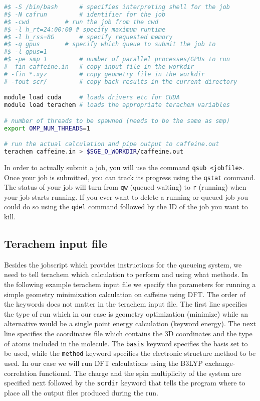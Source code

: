 \documentclass[a4paper,12pt]{assignment}
\begin{document}
\begin{lstlisting}[language=bash,caption={Example jobscript file},frame=trBL]
#$ -S /bin/bash      # specifies interpreting shell for the job
#$ -N cafrun	     # identifier for the job
#$ -cwd		     # run the job from the cwd
#$ -l h_rt=24:00:00 # specify maximum runtime
#$ -l h_rss=8G	     # specify requested memory
#$ -q gpus	     # specify which queue to submit the job to
#$ -l gpus=1
#$ -pe smp 1	     # number of parallel processes/GPUs to run 
# -fin caffeine.in   # copy input file in the workdir 
# -fin *.xyz	     # copy geometry file in the workdir
# -fout scr/         # copy back results in the current directory

module load cuda     # loads drivers etc for CUDA
module load terachem # loads the appropriate terachem variables

# number of threads to be spawned (needs to be the same as smp)
export OMP_NUM_THREADS=1  

# run the actual calculation and pipe output to caffeine.out
terachem caffeine.in > $SGE_O_WORKDIR/caffeine.out 
\end{lstlisting}

In order to actually submit a job, you will use the command \texttt{qsub <jobfile>}. Once your job is submitted, you can track its progress using the \texttt{qstat} command. The status of your job will turn from \texttt{qw} (queued waiting) to \texttt{r} (running) when your job starts running. If you ever want to delete a running or queued job you could do so using the \texttt{qdel} command followed by the ID of the job you want to kill.


\subsection*{Terachem input file}

Besides the jobscript which provides instructions for the queueing system, we need to tell terachem which calculation to perform and using what methods. In the following example terachem input file we specify the parameters for running a simple geometry minimization calculation on caffeine using DFT. The order of the keywords does not matter in the terachem input file. The first line specifies the type of run which in our case is geometry optimization (minimize) while an alternative would be a single point energy calculation (keyword energy). The next line specifies the coordinates file which contains the 3D coordinates and the type of atoms included in the molecule. The \texttt{basis} keyword specifies the basis set to be used, while the \texttt{method} keyword specifies the electronic structure method to be used. In our case we will run DFT calculations using the B3LYP exchange-correlation functional. The charge and the spin multiplicity of the system are specified next followed by the \texttt{scrdir} keyword that tells the program where to place all the output files produced during the run.
\end{document}
